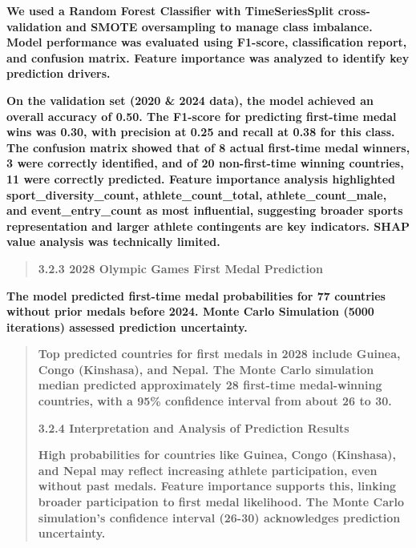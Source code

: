 \documentclass[12pt,a4paper]{article}
\renewenvironment{quote}{\begin{quotation}}{\end{quotation}}  %
\begin{document}
    \textbf{We used a Random Forest Classifier with TimeSeriesSplit
    cross-validation and SMOTE oversampling to manage class imbalance. Model
    performance was evaluated using F1-score, classification report, and
    confusion matrix. Feature importance was analyzed to identify key
    prediction drivers.}
    
    \textbf{On the validation set (2020 \& 2024 data), the model achieved an
    overall accuracy of 0.50. The F1-score for predicting first-time medal
    wins was 0.30, with precision at 0.25 and recall at 0.38 for this class.
    The confusion matrix showed that of 8 actual first-time medal winners, 3
    were correctly identified, and of 20 non-first-time winning countries,
    11 were correctly predicted. Feature importance analysis highlighted
    sport\_diversity\_count, athlete\_count\_total, athlete\_count\_male,
    and event\_entry\_count as most influential, suggesting broader sports
    representation and larger athlete contingents are key indicators. SHAP
    value analysis was technically limited.}
    
    \begin{quote}
    \protect{}\label{bookmark15-1}{}\textbf{3.2.3 2028 Olympic
    Games First Medal Prediction}
    \end{quote}
    
    \textbf{The model predicted first-time medal probabilities for 77
    countries without prior medals before 2024. Monte Carlo Simulation (5000
    iterations) assessed prediction uncertainty.}
    
    \begin{quote}
    \textbf{Top predicted countries for first medals in 2028 include Guinea,
    Congo (Kinshasa), and Nepal. The Monte Carlo simulation median predicted
    approximately 28 first-time medal-winning countries, with a 95\%
    confidence interval from about 26 to 30.}
    
    \protect{}\label{bookmark16-1}{}\textbf{3.2.4
    Interpretation and Analysis of Prediction Results}
    
    \textbf{High probabilities for countries like Guinea, Congo (Kinshasa),
    and Nepal may reflect increasing athlete participation, even without
    past medals. Feature importance supports this, linking broader
    participation to first medal likelihood. The Monte Carlo simulation's
    confidence interval (26-30) acknowledges prediction uncertainty.}
    \end{quote}
    
\end{document}
